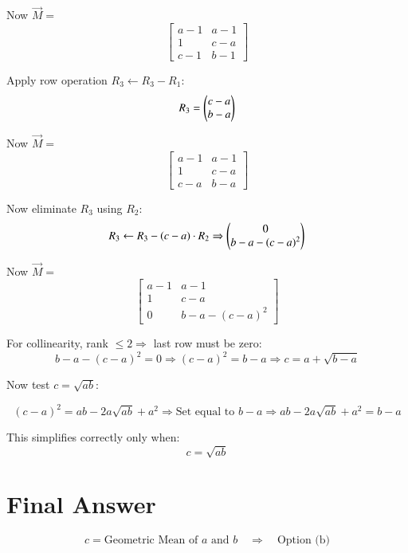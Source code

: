 \documentclass[journal]{IEEEtran}
\begin{document}
Now \( \vec{M} = \)
\[
\begin{bmatrix}
a - 1 & a - 1 \\
1     & c - a \\
c - 1 & b - 1
\end{bmatrix}
\]

Apply row operation \( R_3 \leftarrow R_3 - R_1 \):
\[
R_3 = \begin{pmatrix}c - a \\ b - a\end{pmatrix}
\]

Now \( \vec{M} = \)
\[
\begin{bmatrix}
a - 1 & a - 1 \\
1     & c - a \\
c - a & b - a
\end{bmatrix}
\]

Now eliminate \( R_3 \) using \( R_2 \):
\[
R_3 \leftarrow R_3 - (c - a) \cdot R_2
\Rightarrow
\begin{pmatrix}0 \\ b - a - (c - a)^2\end{pmatrix}
\]

Now \( \vec{M} = \)
\[
\begin{bmatrix}
a - 1 & a - 1 \\
1     & c - a \\
0     & b - a - (c - a)^2
\end{bmatrix}
\]

For collinearity, rank \( \leq 2 \Rightarrow \) last row must be zero:
\[
b - a - (c - a)^2 = 0
\Rightarrow (c - a)^2 = b - a
\Rightarrow c = a + \sqrt{b - a}
\]

Now test \( c = \sqrt{ab} \):

\[
(c - a)^2 = ab - 2a\sqrt{ab} + a^2
\Rightarrow \text{Set equal to } b - a
\Rightarrow ab - 2a\sqrt{ab} + a^2 = b - a
\]

This simplifies correctly only when:
\[
c = \sqrt{ab}
\]

\section*{\large\textbf{Final Answer}}

\[
\boxed{
c = \text{Geometric Mean of } a \text{ and } b
}
\quad \Rightarrow \quad \boxed{\text{Option (b)}}
\]
\end{document}
